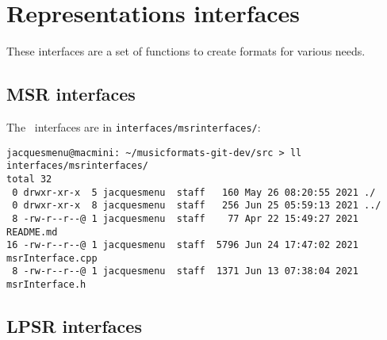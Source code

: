 



\chapter{Representations interfaces}

These interfaces are a set of functions to create formats for various needs.


\section{MSR interfaces}

The \msrRepr\ interfaces are in {\tt interfaces/msrinterfaces/}:
\begin{lstlisting}[language=Terminal]
jacquesmenu@macmini: ~/musicformats-git-dev/src > ll interfaces/msrinterfaces/
total 32
 0 drwxr-xr-x  5 jacquesmenu  staff   160 May 26 08:20:55 2021 ./
 0 drwxr-xr-x  8 jacquesmenu  staff   256 Jun 25 05:59:13 2021 ../
 8 -rw-r--r--@ 1 jacquesmenu  staff    77 Apr 22 15:49:27 2021 README.md
16 -rw-r--r--@ 1 jacquesmenu  staff  5796 Jun 24 17:47:02 2021 msrInterface.cpp
 8 -rw-r--r--@ 1 jacquesmenu  staff  1371 Jun 13 07:38:04 2021 msrInterface.h
\end{lstlisting}


\section{LPSR interfaces}

